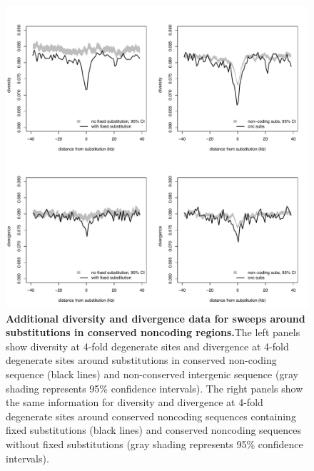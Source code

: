 \begin{figure}[h!]
      \centering
       \includegraphics[width=\linewidth]{Ch2FigS9}
    \caption{\textbf{Additional diversity and divergence data for sweeps around substitutions in conserved noncoding regions.}The left panels show diversity at 4-fold degenerate sites and divergence at 4-fold degenerate sites around substitutions in conserved non-coding sequence (black lines) and non-conserved intergenic sequence (gray shading represents 95\% confidence intervals). The right panels show the same information for diversity and divergence at 4-fold degenerate sites around conserved noncoding sequences containing fixed substitutions (black lines) and conserved noncoding sequences without fixed substitutions (gray shading represents 95\% confidence intervals).}
    \label{fig:figS9}
\end{figure}

